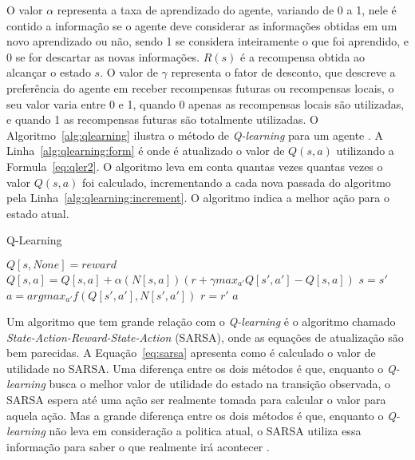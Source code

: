 O valor $\alpha$ representa a taxa de aprendizado do agente, variando de 0 a 1, nele é contido a informação se o agente deve considerar as informações obtidas em um novo aprendizado ou não, sendo 1 se considera inteiramente o que foi aprendido, e 0 se for descartar as novas informações. $R(s)$ é a recompensa obtida ao alcançar o estado $s$. O valor de $\gamma$ representa o fator de desconto, que descreve a preferência do agente em receber recompensas futuras ou recompensas locais, o seu valor varia entre 0 e 1, quando 0 apenas as recompensas locais são utilizadas, e quando 1 as recompensas futuras são totalmente utilizadas. O Algoritmo~\ref{alg:qlearning} ilustra o método de \textit{Q-learning} para um agente \cite{intelligence2003modern}. A Linha~\ref{alg:qlearning:form} é onde é atualizado o valor de $Q(s, a)$ utilizando a Formula~\ref{eq:qler2}. O algoritmo leva em conta quantas vezes quantas vezes o valor $Q(s, a)$ foi calculado, incrementando a cada nova passada do algoritmo pela Linha~\ref{alg:qlearning:increment}. O algoritmo indica a melhor ação para o estado atual.  

\begin{algorithm}
	\caption{Q-Learning}
	\label{alg:qlearning}
	\begin{algorithmic}[1]	
		\State	\Return $Q[s, None] = reward$
		\EndIf
		 \label{alg:qlearning:increment}
		\State $Q[s, a] = Q[s, a] + \alpha(N[s, a]) (r + \gamma max_{a'} Q[s', a'] - Q[s, a])$ \label{alg:qlearning:form}
		\State $s = s'$
		\State $a = argmax_{a'} f(Q[s', a'], N[s', a'])$ \label{alg:qlearning:f}
		\State $r = r'$
		\EndIf	
		\State \Return $a$
		\EndFunction
	\end{algorithmic}
\end{algorithm}


Um algoritmo que tem grande relação com o \textit{Q-learning} é o algoritmo chamado \textit{State-Action-Reward-State-Action} (SARSA), onde as equações de atualização são bem parecidas. A Equação~\ref{eq:sarsa} apresenta como é calculado o valor de utilidade no SARSA. Uma diferença entre os dois métodos é que, enquanto o \textit{Q-learning} busca o melhor valor de utilidade do estado na transição observada, o SARSA espera até uma ação ser realmente tomada para calcular o valor para aquela ação. Mas a grande diferença entre os dois métodos é que, enquanto o \textit{Q-learning} não leva em consideração a politica atual, o SARSA utiliza essa informação para saber o que realmente irá acontecer \cite{intelligence2003modern}. 

